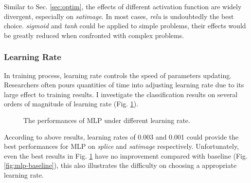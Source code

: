 \documentclass[12pt,a4paper]{article}
\theoremstyle{definition}
\begin{document}
Similar to Sec. \ref{sec:optim}, the effects of different activation function are widely divergent, especially on \textit{satimage}. In most cases, \textit{relu} is undoubtedly the best choice. \textit{sigmoid} and \textit{tanh} could be applied to simple problems, their effects would be greatly reduced when confronted with complex problems.

\subsubsection{Learning Rate}

In training process, learning rate controls the speed of parameters updating. Researchers often pours quantities of time into adjusting learning rate due to its large effect to training results. I investigate the classification results on several orders of magnitude of learning rate (Fig. \ref{fig:mlp-lr}).

\vspace{-0.01\linewidth}
\begin{figure}[H]
	\centering
	\caption{The performances of MLP under different learning rate.}
	\label{fig:mlp-lr}
\end{figure}

According to above results, learning rates of 0.003 and 0.001 could provide the best performances for MLP on \textit{splice} and \textit{satimage} respectively. Unfortunately, even the best results in Fig. \ref{fig:mlp-lr} have no improvement compared with baseline (Fig. \ref{fig:mlp-baseline}), this also illustrates the difficulty on choosing a appropriate learning rate.
\end{document}
